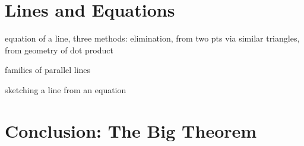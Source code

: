 \documentclass[00-livre-main.tex]{subfiles}
\begin{document}
\section*{Lines and Equations}
\begin{compactitem}
\item equation of a line, three methods: elimination, from two pts via similar triangles, from geometry of dot product
\item families of parallel lines
\item sketching a line from an equation
\end{compactitem}

\section*{Conclusion: The Big Theorem}
\end{document}
